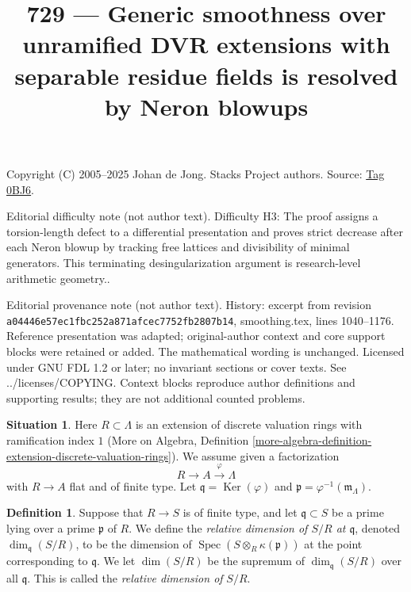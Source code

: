 \documentclass{amsart}
\theoremstyle{plain}
\theoremstyle{definition}
\newtheorem{definition}[subsection]{Definition}
\newtheorem{situation}[subsection]{Situation}
\theoremstyle{remark}
\numberwithin{equation}{subsection}
\def\Spec{\mathop{\mathrm{Spec}}}
\def\Ker{\mathop{\mathrm{Ker}}}
\begin{document}
\title[Stacks Project, Tag 0BJ6]{729 --- Generic smoothness over unramified DVR extensions with separable residue fields is resolved by Neron blowups}
\maketitle
\noindent Copyright (C) 2005--2025 Johan de Jong. Stacks Project authors. Source: \href{https://stacks.math.columbia.edu/tag/0BJ6}{Tag 0BJ6}.

\noindent Editorial difficulty note (not author text). Difficulty H3: The proof assigns a torsion-length defect to a differential presentation and proves strict decrease after each Neron blowup by tracking free lattices and divisibility of minimal generators. This terminating desingularization argument is research-level arithmetic geometry..

\noindent Editorial provenance note (not author text). History: excerpt from revision \texttt{a0444\allowbreak 6e57e\allowbreak c1fbc\allowbreak 252a8\allowbreak 71afc\allowbreak ec775\allowbreak 2fb28\allowbreak 07b14}, smoothing.tex, lines 1040--1176. Reference presentation was adapted; original-author context and core support blocks were retained or added. The mathematical wording is unchanged. Licensed under GNU FDL 1.2 or later; no invariant sections or cover texts. See ../licenses/COPYING. Context blocks reproduce author definitions and supporting results; they are not additional counted problems.

\begin{situation}
\label{situation-neron}
Here $R \subset \Lambda$ is an extension of discrete valuation rings
with ramification index $1$ (More on Algebra, Definition
\ref{more-algebra-definition-extension-discrete-valuation-rings}).
We assume given a factorization
$$
R \to A \xrightarrow{\varphi} \Lambda
$$
with $R \to A$ flat and of finite type. Let $\mathfrak q = \Ker(\varphi)$
and $\mathfrak p = \varphi^{-1}(\mathfrak m_\Lambda)$.
\end{situation}

\begin{definition}
\label{algebra-definition-relative-dimension}
Suppose that $R \to S$ is of finite type, and let
$\mathfrak q \subset S$ be a prime lying over a prime
$\mathfrak p$ of $R$.
We define the {\it relative dimension
of $S/R$ at $\mathfrak q$}, denoted
$\dim_{\mathfrak q}(S/R)$, to be the dimension
of $\Spec(S \otimes_R \kappa(\mathfrak p))$
at the point corresponding to $\mathfrak q$. We let
$\dim(S/R)$ be the supremum of $\dim_{\mathfrak q}(S/R)$
over all $\mathfrak q$. This is called the
{\it relative dimension of} $S/R$.
\end{definition}
\end{document}

